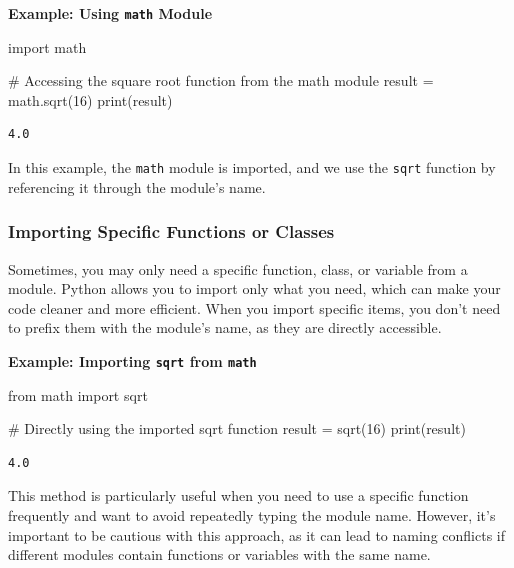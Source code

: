 \documentclass[
  letterpaper,
  DIV=11,
  numbers=noendperiod]{scrreprt}
\newenvironment{Shaded}{\begin{snugshade}}{\end{snugshade}}
\newcommand{\BuiltInTok}[1]{\textcolor[rgb]{0.00,0.23,0.31}{#1}}
\newcommand{\CommentTok}[1]{\textcolor[rgb]{0.37,0.37,0.37}{#1}}
\newcommand{\DecValTok}[1]{\textcolor[rgb]{0.68,0.00,0.00}{#1}}
\newcommand{\ImportTok}[1]{\textcolor[rgb]{0.00,0.46,0.62}{#1}}
\newcommand{\NormalTok}[1]{\textcolor[rgb]{0.00,0.23,0.31}{#1}}
\newcommand{\OperatorTok}[1]{\textcolor[rgb]{0.37,0.37,0.37}{#1}}
\begin{document}
\textbf{Example: Using \texttt{math} Module}

\begin{Shaded}
\begin{Highlighting}[]
\ImportTok{import}\NormalTok{ math}

\CommentTok{\# Accessing the square root function from the math module}
\NormalTok{result }\OperatorTok{=}\NormalTok{ math.sqrt(}\DecValTok{16}\NormalTok{)}
\BuiltInTok{print}\NormalTok{(result) }
\end{Highlighting}
\end{Shaded}

\begin{verbatim}
4.0
\end{verbatim}

In this example, the \texttt{math} module is imported, and we use the
\texttt{sqrt} function by referencing it through the module's name.

\hypertarget{importing-specific-functions-or-classes}{%
\subsubsection{Importing Specific Functions or
Classes}\label{importing-specific-functions-or-classes}}

Sometimes, you may only need a specific function, class, or variable
from a module. Python allows you to import only what you need, which can
make your code cleaner and more efficient. When you import specific
items, you don't need to prefix them with the module's name, as they are
directly accessible.

\textbf{Example: Importing \texttt{sqrt} from \texttt{math}}

\begin{Shaded}
\begin{Highlighting}[]
\ImportTok{from}\NormalTok{ math }\ImportTok{import}\NormalTok{ sqrt}

\CommentTok{\# Directly using the imported sqrt function}
\NormalTok{result }\OperatorTok{=}\NormalTok{ sqrt(}\DecValTok{16}\NormalTok{)}
\BuiltInTok{print}\NormalTok{(result) }
\end{Highlighting}
\end{Shaded}

\begin{verbatim}
4.0
\end{verbatim}

This method is particularly useful when you need to use a specific
function frequently and want to avoid repeatedly typing the module name.
However, it's important to be cautious with this approach, as it can
lead to naming conflicts if different modules contain functions or
variables with the same name.
\end{document}
